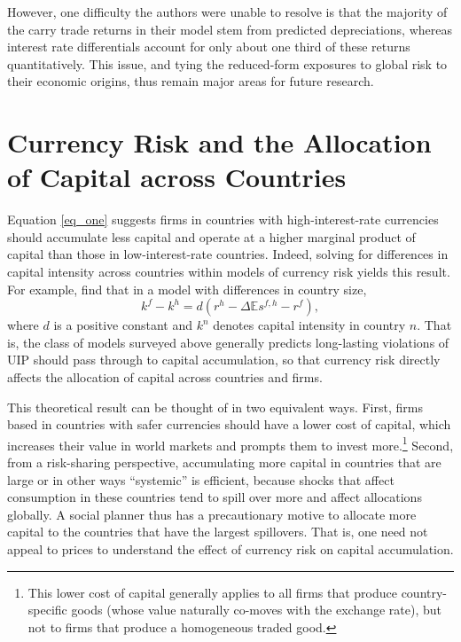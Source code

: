 \documentclass{ar-1col}
\begin{document}
However, one difficulty the authors were unable to resolve is that the majority of the carry trade returns in their model stem from predicted depreciations, whereas interest rate differentials account for only about one third of these returns quantitatively. This issue, and tying the reduced-form exposures to global risk to their economic origins, thus remain major areas for future research.


\section{Currency Risk and the Allocation of Capital across Countries\label{sec_capital}}

Equation \ref{eq_one} suggests firms in countries with high-interest-rate currencies should accumulate less capital and operate at a higher marginal product of capital than those in low-interest-rate countries. Indeed, solving for differences in capital intensity across countries within models of currency risk yields this result. For example, \citet{HassanMertensZhang2015} find that in a model with differences in country size,  
\begin{equation}
    k^f - k^h = d
    \left(r^h - \Delta \mathbb{E} s^{f, h} - r^f \right),
\end{equation}
where $d$ is a positive constant and $k^n$ denotes capital intensity in country $n$. That is, the class of models surveyed above generally predicts long-lasting violations of UIP should pass through to capital accumulation, so that currency risk directly affects the allocation of capital across countries and firms.

This theoretical result can be thought of in two equivalent ways. First, firms based in countries with safer currencies should have a lower cost of capital, which increases their value in world markets and prompts them to invest more.\footnote{This lower cost of capital generally applies to all firms that produce country-specific goods (whose value naturally co-moves with the exchange rate), but not to firms that produce a homogeneous traded good.} Second, from a risk-sharing perspective, accumulating more capital in countries that are large or in other ways ``systemic'' is efficient, because shocks that affect consumption in these countries tend to spill over more and affect allocations globally. A social planner thus has a precautionary motive to allocate more capital to the countries that have the largest spillovers. That is, one need not appeal to prices to understand the effect of currency risk on capital accumulation.
\end{document}
